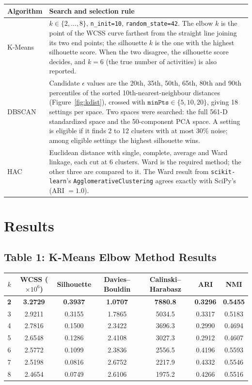 \documentclass[12pt,a4paper]{article}
\begin{document}
\begin{longtable}{p{3.2cm}p{11.8cm}}
\toprule
Algorithm & Search and selection rule \\
\midrule
K-Means & $k \in \{2, \dots, 8\}$, \texttt{n\_init=10}, \texttt{random\_state=42}. The elbow $k$ is
the point of the WCSS curve farthest from the straight line joining its two end points; the
silhouette $k$ is the one with the highest silhouette score. When the two disagree, the
silhouette score decides, and $k=6$ (the true number of activities) is also reported. \\
DBSCAN & Candidate $\epsilon$ values are the 20th, 35th, 50th, 65th, 80th and 90th percentiles of
the sorted 10th-nearest-neighbour distances (Figure~\ref{fig:kdist}), crossed with
$\texttt{minPts} \in \{5, 10, 20\}$, giving 18 settings per space. Two spaces were searched: the
full 561-D standardized space and the 50-component PCA space. A setting is eligible if it finds
2 to 12 clusters with at most 30\% noise; among eligible settings the highest silhouette wins. \\
HAC & Euclidean distance with single, complete, average and Ward linkage, each cut at 6
clusters. Ward is the required method; the other three are compared to it. The Ward result from
\texttt{scikit-learn}'s \texttt{AgglomerativeClustering} agrees exactly with SciPy's
(ARI $= 1.0$). \\
\bottomrule
\end{longtable}

\section{Results}

\subsection*{Table 1: K-Means Elbow Method Results}
\begin{longtable}{ccccccc}
\toprule
$k$ & WCSS ($\times 10^6$) & Silhouette & Davies--Bouldin & Calinski--Harabasz & ARI & NMI \\
\midrule
\textbf{2} & \textbf{3.2729} & \textbf{0.3937} & \textbf{1.0707} & \textbf{7880.8} & \textbf{0.3296} & \textbf{0.5455} \\
3 & 2.9211 & 0.3155 & 1.7865 & 5034.5 & 0.3317 & 0.5183 \\
4 & 2.7816 & 0.1500 & 2.3422 & 3696.3 & 0.2990 & 0.4694 \\
5 & 2.6548 & 0.1286 & 2.4108 & 3027.3 & 0.2912 & 0.4607 \\
6 & 2.5772 & 0.1099 & 2.3836 & 2556.5 & 0.4196 & 0.5593 \\
7 & 2.5198 & 0.0816 & 2.6752 & 2217.9 & 0.4332 & 0.5546 \\
8 & 2.4654 & 0.0749 & 2.6106 & 1975.2 & 0.4266 & 0.5516 \\
\bottomrule
\end{longtable}
\end{document}
